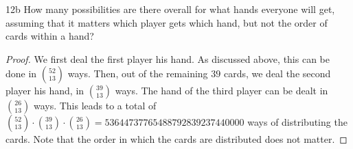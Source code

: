\begin{exercise}{12b}
    How many possibilities are there overall for what hands everyone will get, assuming
that it matters which player gets which hand, but not the order of cards within a hand?
\end{exercise}

\begin{proof}
    We first deal the first player his hand. As discussed above, this can be done in $52 \choose 13$ ways. Then, out of the remaining $39$ cards, we deal the second player his hand, in $39 \choose 13$ ways. The hand of the third player can be dealt in $26 \choose 13$ ways. This leads to a total of ${52 \choose 13} \cdot {39 \choose 13} \cdot {26 \choose 13} = 53644737765488792839237440000$ ways of distributing the cards. Note that the order in which the cards are distributed does not matter.
\end{proof}

